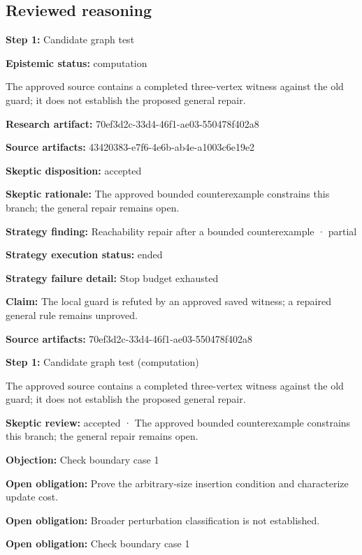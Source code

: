 \documentclass[11pt]{article}
\begin{document}
\subsection{Reviewed reasoning}
\textbf{Step 1:} Candidate graph test\par
\textbf{Epistemic status:} computation\par
The approved source contains a completed three-vertex witness against the old guard; it does not establish the proposed general repair.\par
\textbf{Research artifact:} 70ef3d2c-33d4-46f1-ae03-550478f402a8\par
\textbf{Source artifacts:} 43420383-e7f6-4e6b-ab4e-a1003c6e19e2\par
\textbf{Skeptic disposition:} accepted\par
\textbf{Skeptic rationale:} The approved bounded counterexample constrains this branch; the general repair remains open.\par
\textbf{Strategy finding:} Reachability repair after a bounded counterexample · partial\par
\textbf{Strategy execution status:} ended\par
\textbf{Strategy failure detail:} Stop budget exhausted\par
\textbf{Claim:} The local guard is refuted by an approved saved witness; a repaired general rule remains unproved.\par
\textbf{Source artifacts:} 70ef3d2c-33d4-46f1-ae03-550478f402a8\par
\textbf{Step 1:} Candidate graph test (computation)\par
The approved source contains a completed three-vertex witness against the old guard; it does not establish the proposed general repair.\par
\textbf{Skeptic review:} accepted · The approved bounded counterexample constrains this branch; the general repair remains open.\par
\textbf{Objection:} Check boundary case 1\par
\textbf{Open obligation:} Prove the arbitrary-size insertion condition and characterize update cost.\par
\textbf{Open obligation:} Broader perturbation classification is not established.\par
\textbf{Open obligation:} Check boundary case 1\par
\end{document}
